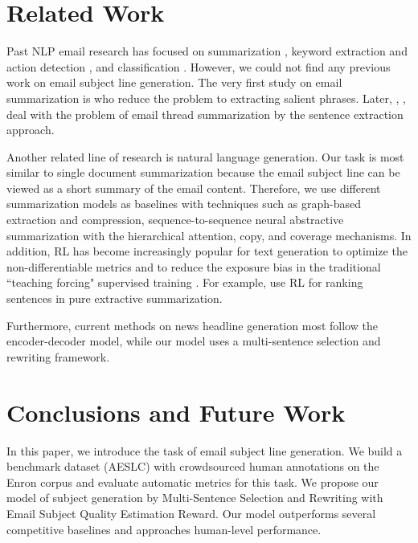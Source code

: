 \documentclass[11pt,a4paper]{article}
\begin{document}
\section{Related Work}
\vspace{-1mm}
Past NLP email research has focused on summarization \cite{muresan2001combining,nenkova2003facilitating,rambow2004summarizing,corston2004task,wan2004generating,carenini2007summarizing,zajic2008single,carenini2008summarizing,ulrich2009regression}, keyword extraction and action detection \cite{turney2000learning,bennett2005detecting,dredze2008generating,scerri2010classifying,loza2014building,lahiri2017keyword,lin2018actionable}, and classification \cite{prabhakaran2014gender,prabhakaran2014predicting,alkhereyf2017work}.
However, we could not find any previous work on email subject line generation.
The very first study on email summarization is  who reduce the problem to extracting salient phrases.
Later, , ,  deal with the problem of email thread summarization by the sentence extraction approach.

Another related line of research is natural language generation.
Our task is most similar to single document summarization because the email subject line can be viewed as a short summary of the email content.
Therefore, we use different summarization models as baselines with techniques such as graph-based extraction and compression, sequence-to-sequence neural abstractive summarization with the hierarchical attention, copy, and coverage mechanisms.
In addition, RL has become increasingly popular for text generation to optimize the non-differentiable metrics and to reduce the exposure bias in the traditional ``teaching forcing" supervised training \cite{ranzato2016sequence,bahdanau2017actor,zhang2017sentence,sakaguchi2017grammatical}.
For example,  use RL for ranking sentences in pure extractive summarization.

Furthermore, current methods on news headline generation \cite{lopyrev2015generating,tilk2017low,kiyono2017source,tan2017neural,shen2017recent} most follow the encoder-decoder model, while our model uses a multi-sentence selection and rewriting framework.

\section{Conclusions and Future Work}
\vspace{-1mm}
In this paper, we introduce the task of email subject line generation.
We build a benchmark dataset (AESLC) with crowdsourced human annotations on the Enron corpus and evaluate automatic metrics for this task.
We propose our model of subject generation by Multi-Sentence Selection and Rewriting with Email Subject Quality Estimation Reward.
Our model outperforms several competitive baselines and approaches human-level performance.
\end{document}
